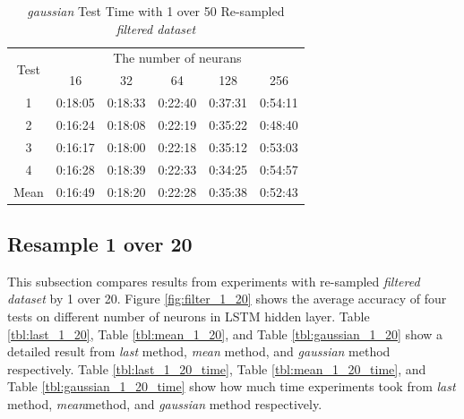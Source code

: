 \documentclass[draft,dvipsnames]{drexel-thesis}
\begin{document}
\begin{thesis}
\begin{table}[!t]
\centering
\caption{{\em gaussian} Test Time with 1 over 50 Re-sampled {\em filtered dataset}}
\label{tbl:gaussian_1_50_time}
\begin{tabular}{|c|c|c|c|c|c|}
\hline
\multirow{2}{*}{Test}      & \multicolumn{5}{c|}{The number of neurans}                                                                                                               \\ \cline{2-6}
                           & 16                           & 32                           & 64                           & 128                          & 256                          \\ \hline
1                          & 0:18:05                      & 0:18:33                      & 0:22:40                      & 0:37:31                      & 0:54:11                      \\ \hline
2                          & 0:16:24                      & 0:18:08                      & 0:22:19                      & 0:35:22                      & 0:48:40                      \\ \hline
3                          & 0:16:17                      & 0:18:00                      & 0:22:18                      & 0:35:12                      & 0:53:03                      \\ \hline
4                          & 0:16:28                      & 0:18:39                      & 0:22:33                      & 0:34:25                      & 0:54:57                      \\ \hline
\multicolumn{1}{|l|}{Mean} & \multicolumn{1}{l|}{0:16:49} & \multicolumn{1}{l|}{0:18:20} & \multicolumn{1}{l|}{0:22:28} & \multicolumn{1}{l|}{0:35:38} & \multicolumn{1}{l|}{0:52:43} \\ \hline
\end{tabular}
\end{table}


\subsection{Resample 1 over 20}
This subsection compares results from experiments with re-sampled {\em filtered dataset} by 1 over 20. Figure \ref{fig:filter_1_20} shows the average accuracy of four tests on different number of neurons in LSTM hidden layer. Table \ref{tbl:last_1_20}, Table \ref{tbl:mean_1_20}, and Table \ref{tbl:gaussian_1_20} show a detailed result from {\em last} method, {\em mean} method, and {\em gaussian} method respectively. Table \ref{tbl:last_1_20_time}, Table \ref{tbl:mean_1_20_time}, and Table \ref{tbl:gaussian_1_20_time} show how much time experiments took from {\em last} method, {\em mean}method, and {\em gaussian} method respectively.


\end{thesis}
\end{document}
